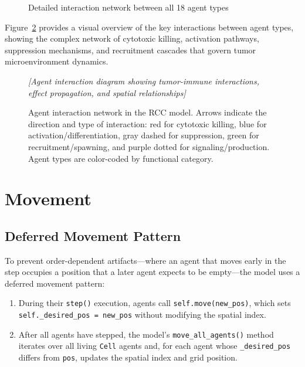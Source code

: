 \begin{figure}[htbp]
\centering
{}
\caption{Detailed interaction network between all 18 agent types}
\label{fig:agent_interaction_network}
\end{figure}

Figure~\ref{fig:agent_interactions} provides a visual overview of the key interactions between agent types, showing the complex network of cytotoxic killing, activation pathways, suppression mechanisms, and recruitment cascades that govern tumor microenvironment dynamics.

\begin{figure}[htbp]
\centering
\textit{[Agent interaction diagram showing tumor-immune interactions, effect propagation, and spatial relationships]}
\caption{Agent interaction network in the RCC model. Arrows indicate the direction and type of interaction: red for cytotoxic killing, blue for activation/differentiation, gray dashed for suppression, green for recruitment/spawning, and purple dotted for signaling/production. Agent types are color-coded by functional category.}
\label{fig:agent_interactions}
\end{figure}

\section{Movement}
\label{sec:md_movement}

\subsection{Deferred Movement Pattern}
\label{subsec:md_deferred}

To prevent order-dependent artifacts---where an agent that moves early in the step occupies a position that a later agent expects to be empty---the model uses a deferred movement pattern:

\begin{enumerate}[nosep]
    \item During their \texttt{step()} execution, agents call \texttt{self.move(new\_pos)}, which sets \texttt{self.\_desired\_pos = new\_pos} without modifying the spatial index.
    \item After all agents have stepped, the model's \texttt{move\_all\_agents()} method iterates over all living \texttt{Cell} agents and, for each agent whose \texttt{\_desired\_pos} differs from \texttt{pos}, updates the spatial index and grid position.
\end{enumerate}

